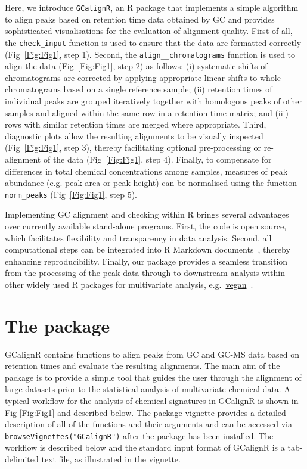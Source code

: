 \documentclass[10pt,letterpaper]{article}
\begin{document}
Here, we introduce \texttt{GCalignR}, an R package that implements a simple algorithm to align peaks based on retention time data obtained by GC and provides sophisticated visualisations for the evaluation of alignment quality. First of all, the \texttt{check\_input} function is used to ensure that the data are formatted correctly (Fig~\ref{Fig:Fig1}, step 1). Second, the \texttt{align\_\_chromatograms} function is used to align the data (Fig~\ref{Fig:Fig1}, step 2) as follows: (i) systematic shifts of chromatograms are corrected by applying appropriate linear shifts to whole chromatograms based on a single reference sample; (ii) retention times of individual peaks are grouped iteratively together with homologous peaks of other samples and aligned within the same row in a retention time matrix; and (iii) rows with similar retention times are merged where appropriate. Third, diagnostic plots allow the resulting alignments to be visually inspected (Fig~\ref{Fig:Fig1}, step 3), thereby facilitating optional pre-processing or re-alignment of the data (Fig~\ref{Fig:Fig1}, step 4). Finally, to compensate for differences in total chemical concentrations among samples, measures of peak abundance (e.g. peak area or peak height) can be normalised using the function \texttt{norm\_peaks} (Fig~\ref{Fig:Fig1}, step 5). \par


Implementing GC alignment and checking within R brings several advantages over currently available stand-alone programs. First, the code is open source, which facilitates flexibility and transparency in data analysis. Second, all computational steps can be integrated into R Markdown documents~\cite{Allaire.2016}, thereby enhancing reproducibility. Finally, our package provides a seamless transition from the processing of the peak data through to downstream analysis within other widely used R packages for multivariate analysis, e.g.~\href{https://CRAN.R-project.org/package=vegan}{vegan}~\cite{Oksanen.2016}.

\section*{The package}
GCalignR contains functions to align peaks from GC and GC-MS data based on retention times and evaluate the resulting alignments. The main aim of the package is to provide a simple tool that guides the user through the alignment of large datasets prior to the statistical analysis of multivariate chemical data. A typical workflow for the analysis of chemical signatures in GCalignR is shown in Fig \ref{Fig:Fig1} and described below. The package vignette provides a detailed description of all of the functions and their arguments and can be accessed via \texttt{browseVignettes("GCalignR")} after the package has been installed. The workflow is described below and the standard input format of GCalignR is a tab-delimited text file, as illustrated in the vignette.
\end{document}
